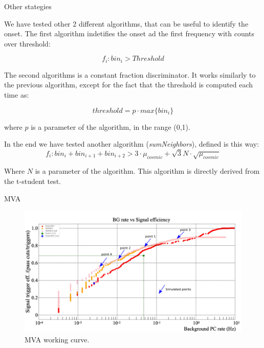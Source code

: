 \documentclass[8pt]{beamer}
\begin{document}
\begin{frame}{Other stategies}

We have tested other 2 different algorithms, that can be useful to identify the onset. The first algorithm indetifies the onset ad the first frequency with counts over threshold:

\begin{equation}
f_{i} : bin_{i} > Threshold
\end{equation}

The second algorithms is a constant fraction discriminator. It works similarly to the previous algorithm, except for the fact that the threshold is computed each time as:

\begin{equation}
threshold = p \cdot max\{bin_{i}  \}
\end{equation}

where $p$ is a parameter of the algorithm, in the range (0,1).

In the end we have tested another algorithm (\textit{sumNeighbors}), defined is this way:
\begin{equation}
f_{i} : bin_{i} + bin_{i+1} + bin_{i +2} > 3\cdot \mu_{cosmic} + \sqrt{3}   N \cdot \sqrt{\mu_{cosmic}} 
\end{equation}

Where $N$ is a parameter of the algorithm. This algorithm is directly derived from the t-student test.

\end{frame}

\begin{frame}{MVA}
\begin{figure}[hbtp]
\centering
\includegraphics[width = \textwidth]{MVA.pdf}
\caption{MVA working curve.}
\end{figure}

\end{frame}
\end{document}
